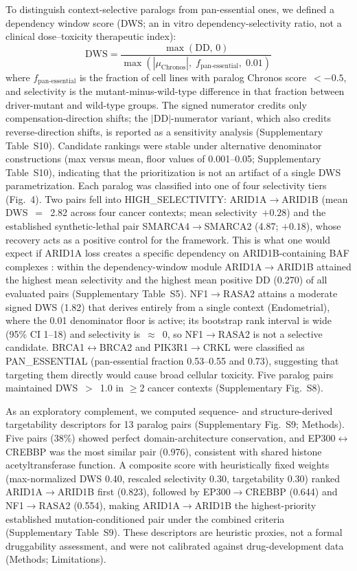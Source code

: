 \documentclass[11pt,a4paper]{article}
\begin{document}
To distinguish context-selective paralogs from pan-essential ones, we defined a dependency window score (DWS; an in vitro dependency-selectivity ratio, not a clinical dose--toxicity therapeutic index):
\begin{equation}
\text{DWS} = \frac{\max(\text{DD},\,0)}{\max(|\mu_{\text{Chronos}}|,\;f_{\text{pan-essential}},\;0.01)}
\label{eq:ti}
\end{equation}
where $f_{\text{pan-essential}}$ is the fraction of cell lines with paralog Chronos score~$<-0.5$, and selectivity is the mutant-minus-wild-type difference in that fraction between driver-mutant and wild-type groups. The signed numerator credits only compensation-direction shifts; the $|$DD$|$-numerator variant, which also credits reverse-direction shifts, is reported as a sensitivity analysis (Supplementary Table~S10). Candidate rankings were stable under alternative denominator constructions (max versus mean, floor values of 0.001--0.05; Supplementary Table~S10), indicating that the prioritization is not an artifact of a single DWS parametrization. Each paralog was classified into one of four selectivity tiers (Fig.~4). Two pairs fell into HIGH\_SELECTIVITY: ARID1A$\rightarrow$ARID1B (mean DWS~$=$~2.82 across four cancer contexts; mean selectivity~$+0.28$) and the established synthetic-lethal pair SMARCA4$\rightarrow$SMARCA2 (4.87; $+0.18$), whose recovery acts as a positive control for the framework. This is what one would expect if ARID1A loss creates a specific dependency on ARID1B-containing BAF complexes \cite{Helming2014}: within the dependency-window module ARID1A$\rightarrow$ARID1B attained the highest mean selectivity and the highest mean positive DD (0.270) of all evaluated pairs (Supplementary Table~S5). NF1$\rightarrow$RASA2 attains a moderate signed DWS (1.82) that derives entirely from a single context (Endometrial), where the 0.01 denominator floor is active; its bootstrap rank interval is wide (95\% CI 1--18) and selectivity is~$\approx$~0, so NF1$\rightarrow$RASA2 is not a selective candidate. BRCA1$\leftrightarrow$BRCA2 and PIK3R1$\rightarrow$CRKL were classified as PAN\_ESSENTIAL (pan-essential fraction 0.53--0.55 and 0.73), suggesting that targeting them directly would cause broad cellular toxicity. Five paralog pairs maintained DWS~$>$~1.0 in $\ge$2 cancer contexts (Supplementary Fig.~S8).

As an exploratory complement, we computed sequence- and structure-derived targetability descriptors for 13 paralog pairs (Supplementary Fig.~S9; Methods). Five pairs (38\%) showed perfect domain-architecture conservation, and EP300$\leftrightarrow$CREBBP was the most similar pair (0.976), consistent with shared histone acetyltransferase function. A composite score with heuristically fixed weights (max-normalized DWS 0.40, rescaled selectivity 0.30, targetability 0.30) ranked ARID1A$\rightarrow$ARID1B first (0.823), followed by EP300$\rightarrow$CREBBP (0.644) and NF1$\rightarrow$RASA2 (0.554), making ARID1A$\rightarrow$ARID1B the highest-priority established mutation-conditioned pair under the combined criteria (Supplementary Table~S9). These descriptors are heuristic proxies, not a formal druggability assessment, and were not calibrated against drug-development data (Methods; Limitations).
\end{document}
